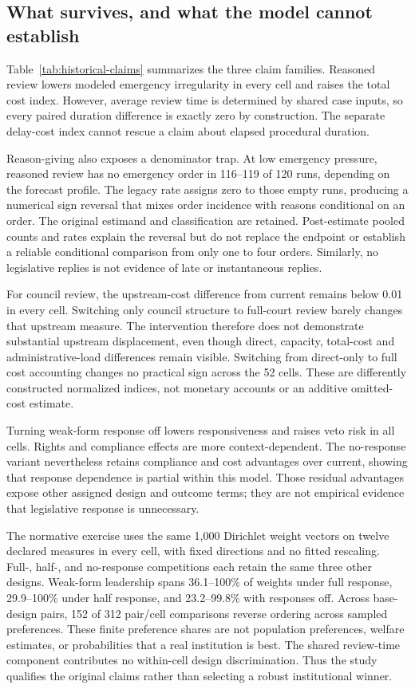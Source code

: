 \documentclass[
  journal=small,
  manuscript=research-article,
  year=2026
]{cup-journal}
\begin{document}
\subsection{What survives, and what the model cannot establish}

Table~\ref{tab:historical-claims} summarizes the three claim families. Reasoned review lowers modeled emergency irregularity in every cell and raises the total cost index. However, average review time is determined by shared case inputs, so every paired duration difference is exactly zero by construction. The separate delay-cost index cannot rescue a claim about elapsed procedural duration.



Reason-giving also exposes a denominator trap. At low emergency pressure, reasoned review has no emergency order in 116--119 of 120 runs, depending on the forecast profile. The legacy rate assigns zero to those empty runs, producing a numerical sign reversal that mixes order incidence with reasons conditional on an order. The original estimand and classification are retained. Post-estimate pooled counts and rates explain the reversal but do not replace the endpoint or establish a reliable conditional comparison from only one to four orders. Similarly, no legislative replies is not evidence of late or instantaneous replies.

For council review, the upstream-cost difference from current remains below 0.01 in every cell. Switching only council structure to full-court review barely changes that upstream measure. The intervention therefore does not demonstrate substantial upstream displacement, even though direct, capacity, total-cost and administrative-load differences remain visible. Switching from direct-only to full cost accounting changes no practical sign across the 52 cells. These are differently constructed normalized indices, not monetary accounts or an additive omitted-cost estimate.

Turning weak-form response off lowers responsiveness and raises veto risk in all cells. Rights and compliance effects are more context-dependent. The no-response variant nevertheless retains compliance and cost advantages over current, showing that response dependence is partial within this model. Those residual advantages expose other assigned design and outcome terms; they are not empirical evidence that legislative response is unnecessary.

The normative exercise uses the same 1,000 Dirichlet weight vectors on twelve declared measures in every cell, with fixed directions and no fitted rescaling. Full-, half-, and no-response competitions each retain the same three other designs. Weak-form leadership spans 36.1--100\% of weights under full response, 29.9--100\% under half response, and 23.2--99.8\% with responses off. Across base-design pairs, 152 of 312 pair/cell comparisons reverse ordering across sampled preferences. These finite preference shares are not population preferences, welfare estimates, or probabilities that a real institution is best. The shared review-time component contributes no within-cell design discrimination. Thus the study qualifies the original claims rather than selecting a robust institutional winner.
\end{document}
